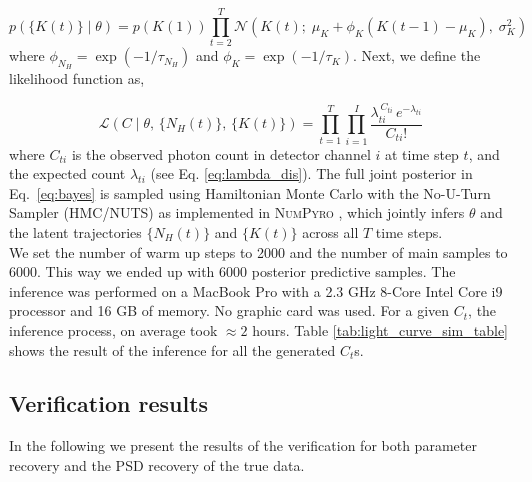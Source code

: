 \documentclass{aa}
\begin{document}
\begin{equation}
p\!\left(\{K(t)\} \mid \theta\right)
= p\!\left(K(1)\right)
\prod_{t=2}^{T}
\mathcal{N}\!\left(K(t);\;
\mu_{K} + \phi_{K}\!\left(K(t-1) - \mu_{K}\right),\;
\sigma_{K}^2\right)
\label{eq:ar1_prior_k}
\end{equation}
where $\phi_{N_H} = \exp(-1/\tau_{N_H})$ and 
$\phi_K = \exp(-1/\tau_K)$. Next, we define the likelihood function as,

\begin{equation}
\mathcal{L}\!\left(C \mid \theta,\,\{N_H(t)\},\,\{K(t)\}\right)
= \prod_{t=1}^{T} \prod_{i=1}^{I}
\frac{\lambda_{ti}^{\,C_{ti}}\, e^{-\lambda_{ti}}}{C_{ti}!}
\label{eq:likelihood}
\end{equation}
where $C_{ti}$ is the observed photon count in detector channel $i$ at time step $t$, and the expected count $\lambda_{ti}$ (see Eq. \ref{eq:lambda_dis}). The full joint posterior in Eq.~\eqref{eq:bayes} is sampled using Hamiltonian Monte 
Carlo with the No-U-Turn Sampler (HMC/NUTS) as implemented in \textsc{NumPyro} \citep{phan2019composable}, which jointly infers $\theta$ and the latent trajectories $\{N_H(t)\}$ and $\{K(t)\}$ across all $T$ time steps. \\
We set the number of warm up steps to 2000 and the number of main samples to 6000. This way we ended up with 6000 posterior predictive samples. The inference was performed on a MacBook Pro with a 2.3 GHz 8-Core Intel Core i9 processor and 16 GB of memory. No graphic card was used. For a given $C_t$, the inference process, on average took $\approx 2$ hours. Table \ref{tab:light_curve_sim_table} shows the result of the inference for all the generated $C_t$s. \\

\subsection{Verification results}
\label{sec:verification_results}
In the following we present the results of the verification for both parameter recovery and the PSD recovery of the true data.\\
\end{document}
